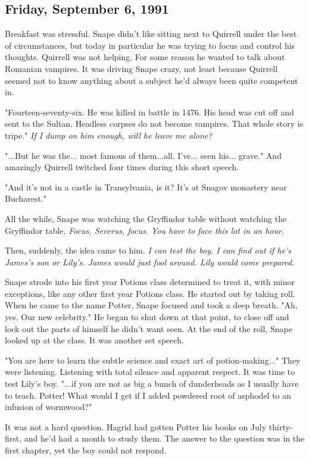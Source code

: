 \subsection{Friday, September 6, 1991}

Breakfast was stressful. Snape didn't like sitting next to Quirrell under the best of circumstances, but today in particular he was trying to focus and control his thoughts. Quirrell was not helping. For some reason he wanted to talk about Romanian vampires. It was driving Snape crazy, not least because Quirrell seemed not to know anything about a subject he'd always been quite competent in.

"Fourteen-seventy-six. He was killed in battle in 1476. His head was cut off and sent to the Sultan. Headless corpses do not become vampires. That whole story is tripe." \emph{If I dump on him enough, will he leave me alone?}

"...But he was the... most famous of them...all. I've... seen his... grave." And amazingly Quirrell twitched four times during this short speech.

"And it's not in a castle in Transylvania, is it? It's at Snagov monastery near Bucharest."

All the while, Snape was watching the Gryffindor table without watching the Gryffindor table. \emph{Focus, Severus, focus. You have to face this lot in an hour.}

Then, suddenly, the idea came to him. \emph{I can test the boy. I can find out if he's James's son or Lily's. James would just fool around. Lily would come prepared.}

Snape strode into his first year Potions class determined to treat it, with minor exceptions, like any other first year Potions class. He started out by taking roll. When he came to the name Potter, Snape focused and took a deep breath. "Ah, yes. Our new celebrity." He began to shut down at that point, to close off and lock out the parts of himself he didn't want seen. At the end of the roll, Snape looked up at the class. It was another set speech.

"You are here to learn the subtle science and exact art of potion-making..." They were listening. Listening with total silence and apparent respect. It was time to test Lily's boy. "...if you are not as big a bunch of dunderheads as I usually have to teach. Potter! What would I get if I added powdered root of asphodel to an infusion of wormwood?"

It was not a hard question. Hagrid had gotten Potter his books on July thirty-first, and he'd had a month to study them. The answer to the question was in the first chapter, yet the boy could not respond.

